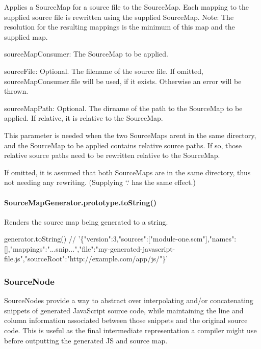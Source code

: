 Applies a Source\+Map for a source file to the Source\+Map. Each mapping to the supplied source file is rewritten using the supplied Source\+Map. Note\+: The resolution for the resulting mappings is the minimum of this map and the supplied map.


\begin{DoxyItemize}
\item {\ttfamily source\+Map\+Consumer}\+: The Source\+Map to be applied.
\item {\ttfamily source\+File}\+: Optional. The filename of the source file. If omitted, source\+Map\+Consumer.\+file will be used, if it exists. Otherwise an error will be thrown.
\item {\ttfamily source\+Map\+Path}\+: Optional. The dirname of the path to the Source\+Map to be applied. If relative, it is relative to the Source\+Map.

This parameter is needed when the two Source\+Maps aren\textquotesingle{}t in the same directory, and the Source\+Map to be applied contains relative source paths. If so, those relative source paths need to be rewritten relative to the Source\+Map.

If omitted, it is assumed that both Source\+Maps are in the same directory, thus not needing any rewriting. (Supplying `\textquotesingle{}.\textquotesingle{}` has the same effect.)
\end{DoxyItemize}

\paragraph*{Source\+Map\+Generator.\+prototype.\+to\+String()}

Renders the source map being generated to a string.


\begin{DoxyCode}
generator.toString()
//
       '\{"version":3,"sources":["module-one.scm"],"names":[],"mappings":"...snip...","file":"my-generated-javascript-file.js","sourceRoot":"http://example.com/app/js/"\}'
\end{DoxyCode}


\subsubsection*{Source\+Node}

Source\+Nodes provide a way to abstract over interpolating and/or concatenating snippets of generated Java\+Script source code, while maintaining the line and column information associated between those snippets and the original source code. This is useful as the final intermediate representation a compiler might use before outputting the generated JS and source map.

